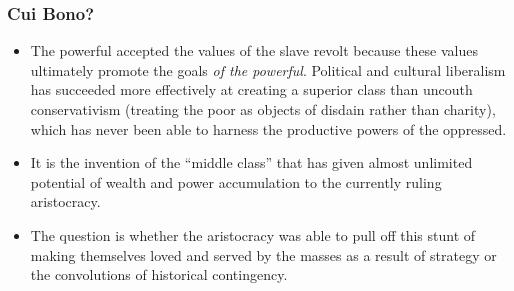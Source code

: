 \documentclass[xcolor=dvipsnames]{beamer}
\begin{document}
\begin{frame}
  \frametitle{Cui Bono?}
  \begin{itemize}
  \item The powerful accepted the values of the slave revolt because
    these values ultimately promote the goals \emph{of the powerful}.
    Political and cultural liberalism has succeeded more effectively
    at creating a superior class than uncouth conservativism (treating
    the poor as objects of disdain rather than charity), which has
    never been able to harness the productive powers of the oppressed.
\item It is the invention of the ``middle class'' that has given
  almost unlimited potential of wealth and power accumulation to the
  currently ruling aristocracy.
\item The question is whether the aristocracy was able to pull off
  this stunt of making themselves loved and served by the masses as a
  result of strategy or the convolutions of historical contingency.
\end{itemize}
\end{frame}
\end{document}
